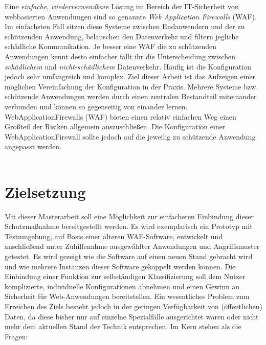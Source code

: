 Eine \emph{einfache}, \emph{wiederverwendbare} Lösung im Bereich der IT-Sicherheit von webbasierten Anwendungen sind so genannte \emph{Web Application Firewalls} (WAF). Im einfachsten Fall sitzen diese Systeme zwischen Endanwendern und der zu schützenden Anwendung, belauschen den Datenverkehr und filtern jegliche schädliche Kommunikation. Je besser eine WAF die zu schützenden Anwendungen kennt desto einfacher fällt ihr die Unterscheidung zwischen \emph{schädlichem} und \emph{nicht-schädlichem} Datenverkehr. Häufig ist die Konfiguration jedoch sehr umfangreich und komplex. Ziel dieser Arbeit ist das Aufzeigen einer möglichen Vereinfachung der Konfiguration in der Praxis. Mehrere Systeme bzw. schützende Anwendungen werden durch einen zentralen Bestandteil miteinander verbunden und können so gegenseitig von einander lernen. WebApplicationFirewalls (WAF) bieten einen relativ einfachen Weg einen Großteil der Risiken allgemein auszuschließen. Die Konfiguration einer WebApplicationFirewall sollte jedoch auf die jeweilig zu schützende Anwendung angepasst werden. \\\\


\section{Zielsetzung}

Mit dieser Masterarbeit soll eine Möglichkeit zur einfacheren Einbindung dieser Schutzmaßnahme bereitgestellt werden. Es wird exemplarisch ein Prototyp mit Testumgebung, auf Basis einer älteren WAF-Software, entwickelt und anschließend unter Zuhilfenahme ausgewählter  Anwendungen und Angriffsmuster getestet.  Es wird gezeigt wie die Software auf einen neuen Stand gebracht wird und wie mehrere Instanzen dieser Software gekoppelt werden können. Die Einbindung einer Funktion zur selbständigen Klassifizierung soll dem Nutzer komplizierte, individuelle Konfigurationen abnehmen und einen Gewinn an Sicherheit für Web-Anwendungen bereitstellen. Ein wesentliches Problem zum Erreichen des Ziels besteht jedoch in der geringen Verfügbarkeit von (öffentlichen) Daten, da diese bisher nur auf einzelne Spezialfälle ausgerichtet waren oder nicht mehr dem aktuellen Stand der Technik entsprechen. Im Kern stehen als die Fragen:

